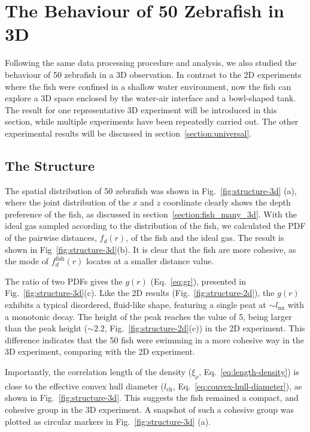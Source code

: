 \documentclass[11pt,twoside]{report}
\begin{document}
\section{The Behaviour of 50 Zebrafish in 3D}

Following the same data processing procedure and analysis, we also studied the behaviour of 50 zebrafish in a 3D observation. In contrast to the 2D experiments where the fish were confined in a shallow water environment, now the fish can explore a 3D space enclosed by the water-air interface and a bowl-shaped tank. The result for one representative 3D experiment will be introduced in this section, while multiple experiments have been repeatedly carried out. The other experimental results will be discussed in section~\ref{section:universal}.

\subsection{The Structure}
\label{section:analysis-structure-3d}


The spatial distribution of 50 zebrafish was shown in Fig.~\ref{fig:structure-3d} (a), where the joint distribution of the $x$ and $z$ coordinate clearly shows the depth preference of the fish, as discussed in section~\ref{section:fish_many_3d}. With the ideal gas sampled according to the distribution of the fish, we calculated the PDF of the pairwise distances, $f_d(r)$, of the fish and the ideal gas. The result is shown in Fig~\ref{fig:structure-3d}(b). It is clear that the fish are more cohesive, as the mode of $f_d^\mathrm{fish}(r)$ locates at a smaller distance value.

The ratio of two PDFs gives the $g(r)$ (Eq.~\ref{eq:gr}), presented in Fig.~\ref{fig:structure-3d}(c). Like the 2D results (Fig.~\ref{fig:structure-2d}), the $g(r)$ exhibits a typical disordered, fluid-like shape, featuring a single peat at $\sim l_\mathrm{nn}$ with a monotonic decay. The height of the peak reaches the value of 5, being larger than the peak height ($\sim 2.2$, Fig.~\ref{fig:structure-2d}(c)) in the 2D experiment. This difference indicates that the 50 fish were swimming in a more cohesive way in the 3D experiment, comparing with the 2D experiment.


Importantly, the correlation length of the density ($\xi_\rho$, Eq.~\ref{eq:length-density}) is close to the effective convex hull diameter ($l_\mathrm{ch}$, Eq.~\ref{eq:convex-hull-diameter}), as shown in Fig.~\ref{fig:structure-3d}. This suggests the fish remained a compact, and cohesive group in the 3D experiment. A snapshot of such a cohesive group was plotted as circular markers in Fig.~\ref{fig:structure-3d} (a).
\end{document}
